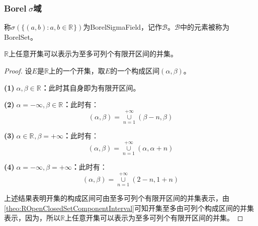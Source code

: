\subsubsection{Borel$\;\sigma$域}
\begin{definition}
	称$\sigma(\{(a,b):a,b\in\mathbb{R}^{}\})$为\gls{BorelSigmaField}，记作$\mathcal{B}$。$\mathcal{B}$中的元素被称为\gls{BorelSet}。
\end{definition}
\begin{lemma}\label{lem:OpenSet=CountableFiniteOpenSetUnion}
	$\mathbb{R}$上任意开集可以表示为至多可列个有限开区间的并集。
\end{lemma}
\begin{proof}
	设$E$是$\mathbb{R}$上的一个开集，取$E$的一个构成区间$(\alpha,\beta)$。\par
	\textbf{(1)$\;\alpha,\beta\in\mathbb{R}^{}$：}此时其自身即为有限开区间。\par
	\textbf{(2)$\;\alpha=-\infty,\beta\in\mathbb{R}^{}$：}此时有：
	\begin{equation*}
		(\alpha,\beta)=\underset{n=1}{\overset{+\infty}{\cup}}(\beta-n,\beta)
	\end{equation*}\par
	\textbf{(3)$\;\alpha\in\mathbb{R}^{},\beta=+\infty$：}此时有：
	\begin{equation*}
		(\alpha,\beta)=\underset{n=1}{\overset{+\infty}{\cup}}(\alpha,\alpha+n)
	\end{equation*}\par
	\textbf{(4)$\;\alpha=-\infty,\beta=+\infty$：}此时有：
	\begin{equation*}
		(\alpha,\beta)=\underset{n=1}{\overset{+\infty}{\cup}}(2-n,1+n)
	\end{equation*}\par
	上述结果表明开集的构成区间可由至多可列个有限开区间的并集表示，由\cref{theo:ROpenClosedSetComponentInterval}可知开集至多由可列个构成区间的并集表示，因为，所以$\mathbb{R}$上任意开集可以表示为至多可列个有限开区间的并集。
\end{proof}
